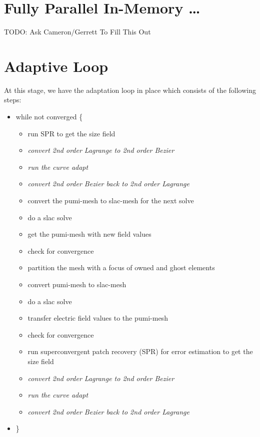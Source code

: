 \documentclass[review,authoryear,12pt]{elsarticle_summary_report}
\begin{document}
\section{Fully Parallel In-Memory \dots}
TODO: Ask Cameron/Gerrett To Fill This Out

\section{Adaptive Loop}
At this stage, we have the adaptation loop in place which consists of the following steps:

\begin{itemize}
  \item[] while not converged \{
   \begin{itemize}
	  \item run SPR to get the size field 
	  \item \textit{convert 2nd order Lagrange to 2nd order Bezier}
	  \item \textit{run the curve adapt}
	  \item \textit{convert 2nd order Bezier back to 2nd order Lagrange}
	  \item convert the pumi-mesh to slac-mesh for the next solve
	  \item do a slac solve
	  \item get the pumi-mesh with new field values
	  \item check for convergence
   \end{itemize}
   \begin{itemize}
          \item partition the mesh with a focus of owned and ghost elements
          \item convert pumi-mesh to slac-mesh
	  \item do a slac solve %
	  \item transfer electric field values to the pumi-mesh
          \item check for convergence
          \item run superconvergent patch recovery (SPR) for error estimation to get the size field 
	  \item \textit{convert 2nd order Lagrange to 2nd order Bezier} %
	  \item \textit{run the curve adapt}
	  \item \textit{convert 2nd order Bezier back to 2nd order Lagrange} %
   \end{itemize}

 \item[] \}
\end{itemize}
\end{document}
